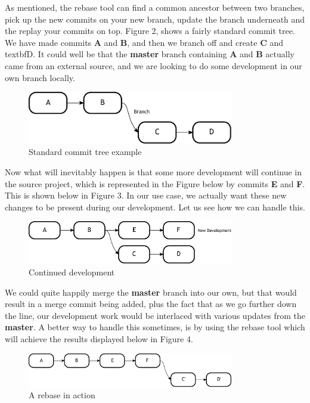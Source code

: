 As mentioned, the rebase tool can find a common ancestor between two branches, pick up the new commits on your new branch, update the branch underneath and the replay your commits on top.  Figure 2, shows a fairly standard commit tree.  We have made commits \textbf{A} and \textbf{B}, and then we branch off and create \textbf{C} and textbf{D}.  It could well be that the \textbf{master} branch containing \textbf{A} and \textbf{B} actually came from an external source, and we are looking to do some development in our own branch locally.

\begin{figure}[hbt]
\centering
\includegraphics[width=9cm]{images/f-w7-d2.pdf}
\caption{Standard commit tree example}
\end{figure}

Now what will inevitably happen is that some more development will continue in the source project, which is represented in the Figure below by commits \textbf{E} and \textbf{F}.  This is shown below in Figure 3.  In our use case, we actually want these new changes to be present during our development.  Let us see how we can handle this.

\begin{figure}[hbt]
\centering
\includegraphics[width=9cm]{images/f-w7-d3.pdf}
\caption{Continued development}
\end{figure}

We could quite happily merge the \textbf{master} branch into our own, but that would result in a merge commit being added, plus the fact that as we go further down the line, our development work would be interlaced with various updates from the \textbf{master}.  A better way to handle this sometimes, is by using the rebase tool which will achieve the results displayed below in Figure 4.

\begin{figure}[hbt]
\centering
\includegraphics[width=9cm]{images/f-w7-d4.pdf}
\caption{A rebase in action}
\end{figure}

